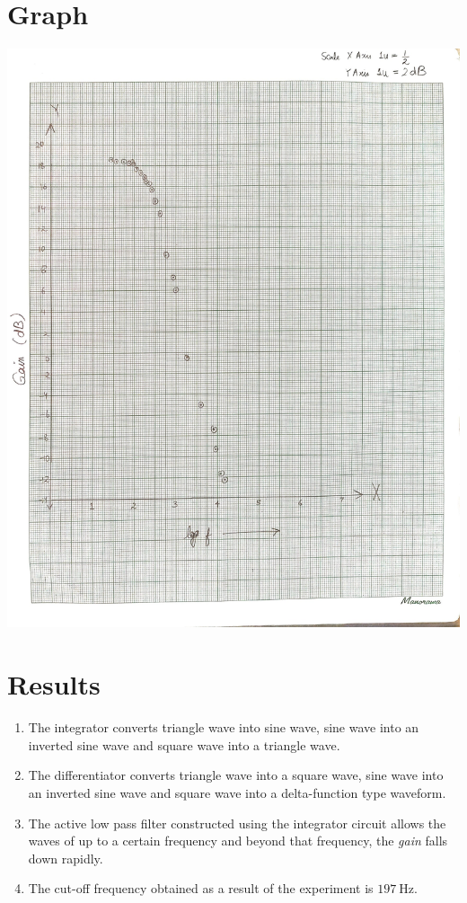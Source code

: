 \section{Graph}
\begin{center}
    \includegraphics[scale = 0.27]{Documents/graph.jpg}
\end{center}
\section{Results}
\begin{enumerate}
    \item The integrator converts triangle wave into sine wave, sine wave into an inverted sine wave and square wave into a triangle wave.
    \item The differentiator converts triangle wave into a square wave, sine wave into an inverted sine wave and square wave into a delta-function type waveform.
    \item The active low pass filter constructed using the integrator circuit allows the waves of up to a certain frequency and beyond that frequency, the \emph{gain} falls down rapidly.
    \item The cut-off frequency obtained as a result of the experiment is $\SI{197}{\hertz}$.
\end{enumerate}
